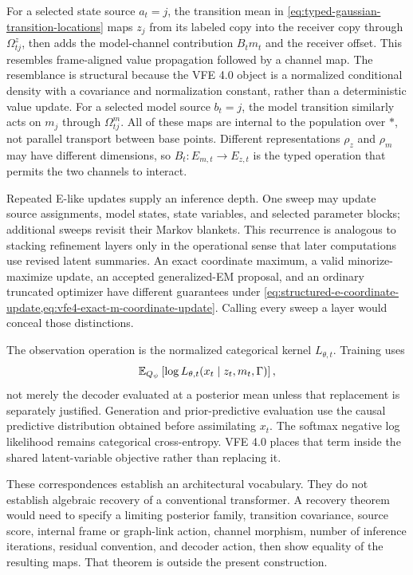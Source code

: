 For a selected state source $a_t=j$, the transition mean in \cref{eq:typed-gaussian-transition-locations} maps $z_j$ from its labeled copy into the receiver copy through $\Omega^z_{tj}$, then adds the model-channel contribution $B_tm_t$ and the receiver offset. This resembles frame-aligned value propagation followed by a channel map. The resemblance is structural because the VFE 4.0 object is a normalized conditional density with a covariance and normalization constant, rather than a deterministic value update. For a selected model source $b_t=j$, the model transition similarly acts on $m_j$ through $\Omega^m_{tj}$. All of these maps are internal to the population over $\ast$, not parallel transport between base points. Different representations $\rho_z$ and $\rho_m$ may have different dimensions, so $B_t:E_{m,t}\to E_{z,t}$ is the typed operation that permits the two channels to interact.

Repeated E-like updates supply an inference depth. One sweep may update source assignments, model states, state variables, and selected parameter blocks; additional sweeps revisit their Markov blankets. This recurrence is analogous to stacking refinement layers only in the operational sense that later computations use revised latent summaries. An exact coordinate maximum, a valid minorize-maximize update, an accepted generalized-EM proposal, and an ordinary truncated optimizer have different guarantees under \cref{eq:structured-e-coordinate-update,eq:vfe4-exact-m-coordinate-update}. Calling every sweep a layer would conceal those distinctions.

The observation operation is the normalized categorical kernel $L_{\theta,t}$. Training uses
\begin{equation}
\mathbb E_{Q_\psi}
\left[
\log L_{\theta,t}(x_t\mid z_t,m_t,\Gamma)
\right],
\label{eq:expected-categorical-transformer-readout}
\end{equation}
not merely the decoder evaluated at a posterior mean unless that replacement is separately justified. Generation and prior-predictive evaluation use the causal predictive distribution obtained before assimilating $x_t$. The softmax negative log likelihood remains categorical cross-entropy. VFE 4.0 places that term inside the shared latent-variable objective rather than replacing it.

These correspondences establish an architectural vocabulary. They do not establish algebraic recovery of a conventional transformer. A recovery theorem would need to specify a limiting posterior family, transition covariance, source score, internal frame or graph-link action, channel morphism, number of inference iterations, residual convention, and decoder action, then show equality of the resulting maps. That theorem is outside the present construction.

